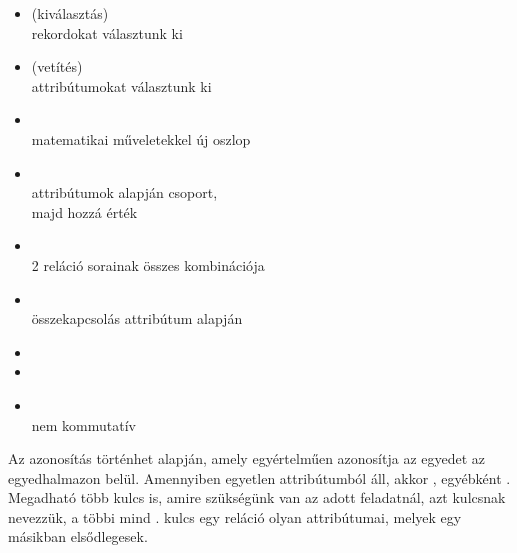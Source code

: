 \documentclass[main.tex]{subfiles}
\begin{document}
  \begin{minipage}[t]{0.5\textwidth}
    \begin{itemize}
      \item {} (kiválasztás) \\
      \tabto{5mm} rekordokat választunk ki
      
      \item {} (vetítés) \\
      \tabto{5mm} attribútumokat választunk ki

      \item {} \\
      \tabto{5mm} matematikai műveletekkel új oszlop

      \item {} \\
      \tabto{5mm} attribútumok alapján csoport, \\
      \tabto{5mm} majd hozzá érték
    \end{itemize}
  \end{minipage}\hfill
  \begin{minipage}[t]{0.5\textwidth}
    \begin{itemize}
      \item {} \\
      \tabto{5mm} 2 reláció sorainak összes kombinációja

      \item {} \\
      \tabto{5mm} összekapcsolás attribútum alapján

      \item {}

      \item {}

      \item {} \\
      \tabto{5mm} nem kommutatív
    \end{itemize}
  \end{minipage}

  \vspace{1em}
  Az azonosítás történhet  alapján,
  amely egyértelműen azonosítja az egyedet az egyedhalmazon belül.
  Amennyiben egyetlen attribútumból áll, akkor ,
  egyébként .
  Megadható több kulcs is, amire szükségünk van az adott
  feladatnál, azt  kulcsnak nevezzük,
  a többi mind .  kulcs egy
  reláció olyan attribútumai, melyek egy másikban elsődlegesek.
\end{document}
